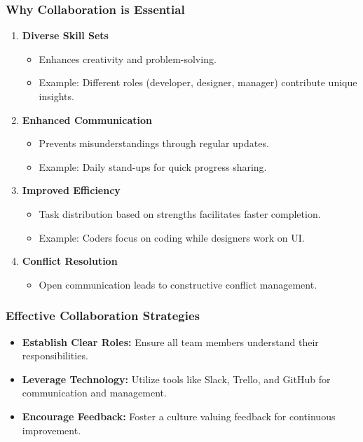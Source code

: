 \documentclass[aspectratio=169]{beamer}
\begin{document}
\begin{frame}[fragile]
    \frametitle{Why Collaboration is Essential}
    \begin{enumerate}
        \item \textbf{Diverse Skill Sets}
            \begin{itemize}
                \item Enhances creativity and problem-solving.
                \item Example: Different roles (developer, designer, manager) contribute unique insights.
            \end{itemize}
        
        \item \textbf{Enhanced Communication}
            \begin{itemize}
                \item Prevents misunderstandings through regular updates.
                \item Example: Daily stand-ups for quick progress sharing.
            \end{itemize}
        
        \item \textbf{Improved Efficiency}
            \begin{itemize}
                \item Task distribution based on strengths facilitates faster completion.
                \item Example: Coders focus on coding while designers work on UI.
            \end{itemize}
        
        \item \textbf{Conflict Resolution}
            \begin{itemize}
                \item Open communication leads to constructive conflict management.
            \end{itemize}
    \end{enumerate}
\end{frame}

\begin{frame}[fragile]
    \frametitle{Effective Collaboration Strategies}
    \begin{itemize}
        \item \textbf{Establish Clear Roles:} Ensure all team members understand their responsibilities.
        \item \textbf{Leverage Technology:} Utilize tools like Slack, Trello, and GitHub for communication and management.
        \item \textbf{Encourage Feedback:} Foster a culture valuing feedback for continuous improvement.
    \end{itemize}
\end{frame}
\end{document}
